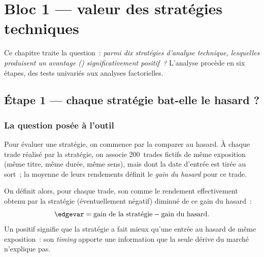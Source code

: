 \chapter{Bloc 1 --- valeur des stratégies techniques}
\label{chap:bloc1}

Ce chapitre traite la question~: \emph{parmi dix stratégies d'analyse
technique, lesquelles produisent un avantage (\edgevar) significativement
positif~?} L'analyse procède en six étapes, des tests univariés aux
analyses factorielles.

\section{Étape 1 --- chaque stratégie bat-elle le hasard ?}
\label{sec:b1-etape1}

\subsection{La question posée à l'outil}
Pour évaluer une stratégie, on commence par la comparer au hasard. À
chaque trade réalisé par la stratégie, on associe 200~trades fictifs de
même exposition (même titre, même durée, même sens), mais dont la date
d'entrée est tirée au sort~; la moyenne de leurs rendements définit le
\emph{gain du hasard} pour ce trade.

On définit alors, pour chaque trade, son \edgevar{} comme le rendement
effectivement obtenu par la stratégie (éventuellement négatif) diminué de
ce gain du hasard~:
\[
  \edgevar = \text{gain de la stratégie} - \text{gain du hasard}.
\]
Un \edgevar{} positif signifie que la stratégie a fait mieux qu'une entrée
au hasard de même exposition~: son \emph{timing} apporte une information
que la seule dérive du marché n'explique pas.

